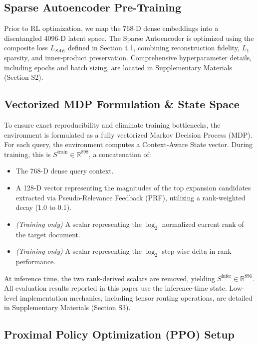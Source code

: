 \documentclass[sigconf]{acmart}
\begin{document}
\subsection{Sparse Autoencoder Pre-Training}

Prior to RL optimization, we map the 768-D dense embeddings into a disentangled 4096-D latent space. The Sparse Autoencoder is optimized using the composite loss $L_{SAE}$ defined in Section 4.1, combining reconstruction fidelity, $L_1$ sparsity, and inner-product preservation. Comprehensive hyperparameter details, including epochs and batch sizing, are located in Supplementary Materials (Section S2).

\subsection{Vectorized MDP Formulation \& State Space}

To ensure exact reproducibility and eliminate training bottlenecks, the environment is formulated as a fully vectorized Markov Decision Process (MDP). For each query, the environment computes a Context-Aware State vector. During training, this is $S^{\text{train}} \in \mathbb{R}^{898}$, a concatenation of:

\begin{itemize}
\item The 768-D dense query context.
\item A 128-D vector representing the magnitudes of the top expansion candidates extracted via Pseudo-Relevance Feedback (PRF), utilizing a rank-weighted decay (1.0 to 0.1).
\item \textit{(Training only)} A scalar representing the $\log_{2}$ normalized current rank of the target document.
\item \textit{(Training only)} A scalar representing the $\log_{2}$ step-wise delta in rank performance.
\end{itemize}

At inference time, the two rank-derived scalars are removed, yielding $S^{\text{infer}} \in \mathbb{R}^{896}$. All evaluation results reported in this paper use the inference-time state. Low-level implementation mechanics, including tensor routing operations, are detailed in Supplementary Materials (Section S3).

\subsection{Proximal Policy Optimization (PPO) Setup}
\end{document}
